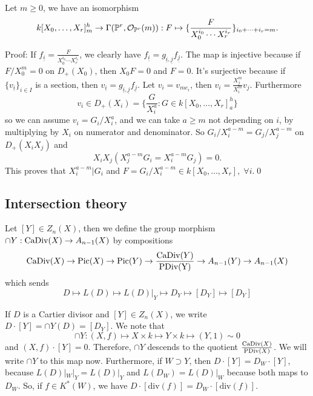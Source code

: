 \begin{dang}
    \begin{proposition}
        Let $m\geq0$, we have an isomorphism 
        \begin{equation}
            k[X_0,\dots, X_r]_m^{h}\to \Gamma(\mathbb{P}^r,\mathcal{O}_{\mathbb{P}^r}(m)):F\mapsto 
            \{\frac{F}{X_0^{i_0}\cdots X_r^{i_r}}\}_{i_0+\cdots + i_r = m}.
        \end{equation}
    \end{proposition}
\end{dang}
Proof: If $f_{\underline{i}} =\tfrac{F}{X_0^{i_0}\cdots X_r^{i_r}} $, we clearly have 
$f_{\underline{i}}=g_{\underline{i},\underline{j}}f_{\underline{j}}$. The map is injective because 
if $F/X_0^m=0$ on $D_+(X_0)$, then $X_0F=0$ and $F=0$. 
It's surjective because if $\{v_{\underline{i}}\}_{i\in I}$ is a section, then 
$v_{\underline{i}}=g_{\underline{i},\underline{j}}f_{\underline{j}}$. Let 
$v_i = v_{me_i}$, then $v_i = \tfrac{X_j^m}{X_i^m}v_j$. Furthermore 
\begin{equation}
    v_i\in D_+(X_i)=\{\frac{G}{X_i^a}:G\in k[X_0,\dots, X_r]_a^h\}
\end{equation}
so we can assume $v_i = G_i/X_i^a$, and we can take $a\geq m$ not depending on $i$, by multiplying 
by $X_i$ on numerator and denominator. So $G_i/X_i^{a-m}= G_j/X_j^{a-m}$ on $D_+(X_iX_j)$ and 
\begin{equation}
    X_iX_j(X_j^{a-m}G_i = X_i^{a-m}G_j) = 0.
\end{equation}
This proves that $X_i^{a-m}|G_i$ and $F= G_i/X_i^{a-m}\in k [X_0,\dots, X_r],\;\forall i$.\qed

\subsection{Intersection theory}

Let $[Y]\in Z_n(X)$, then we define the group morphism $\cap Y: \text{CaDiv}(X) \to A_{n-1}(X) $ by compositions
\begin{equation}
    \text{CaDiv}(X)\to \text{Pic}(X)\to\text{Pic}(Y)\to \frac{\text{CaDiv}(Y)}{\text{PDiv(Y)}}\to A_{n-1}(Y)\to A_{n-1}(X)
\end{equation}
which sends 
\begin{equation}
    D\mapsto L(D)\mapsto L(D)|_Y\mapsto D_Y\mapsto [D_Y] \mapsto [D_Y]
\end{equation}

If $D$ is a Cartier divisor and $[Y]\in Z_n(X)$, we write $D\cdot [Y] = \cap Y(D)= [D_Y]$. We note that 
\begin{equation}
    \cap Y: (X,f)\mapsto X\times k\mapsto Y\times k\mapsto (Y,1)\sim 0
\end{equation}
and $(X,f)\cdot [Y]=0$. Therefore, $\cap Y$ descends to the quotient $\tfrac{\text{CaDiv}(X)}{\text{PDiv}(X)}$. We will 
write $\cap Y$ to this map now. Furthermore, if $W\supset Y$, then 
$D\cdot[Y]=D_W\cdot [Y]$, because $L(D)|_W|_Y=L(D)|_Y$ and 
$L(D_W) = L(D)|_W$ because both maps to $D_W$.
So, if $f\in K^*(W)$, we have 
$D\cdot [\text{div}(f)]= D_W\cdot[\text{div}(f)]$.

